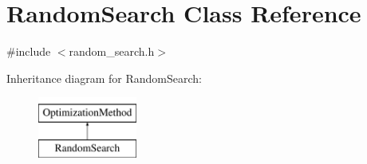 \hypertarget{class_random_search}{}\section{Random\+Search Class Reference}
\label{class_random_search}


{\ttfamily \#include $<$random\+\_\+search.\+h$>$}

Inheritance diagram for Random\+Search\+:\begin{figure}[H]
\begin{center}
\leavevmode
\includegraphics[height=2.000000cm]{class_random_search}
\end{center}
\end{figure}
